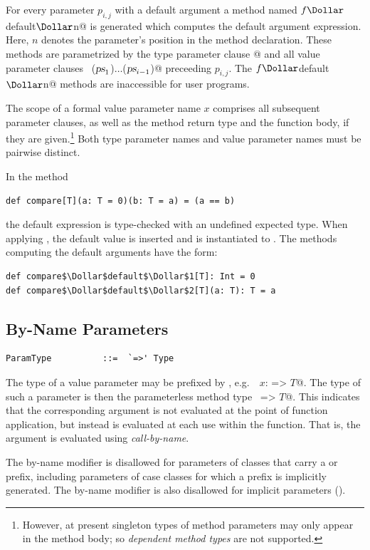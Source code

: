 For every parameter $p_{i,j}$ with a default argument a method named
\lstinline@$f\Dollar$default$\Dollar$n@ is generated which computes the default argument
expression. Here, $n$ denotes the parameter's position in the method
declaration. These methods are parametrized by the type parameter clause
\lstinline@[$\tps\,$]@ and all value parameter clauses
~\lstinline@($\mbox{\sl ps}_1$)$\ldots$($\mbox{\sl ps}_{i-1}$)@ preceeding $p_{i,j}$.
The \lstinline@$f\Dollar$default$\Dollar$n@ methods are inaccessible for
user programs.

The scope of a formal value parameter name $x$ comprises all subsequent parameter
clauses, as well as the method return type and the function body, if
they are given.\footnote{However, at present singleton types of method
parameters may only appear in the method body; so {\em dependent method
types} are not supported.} Both type parameter names
and value parameter names must be pairwise distinct.

\example In the method
\begin{lstlisting}
def compare[T](a: T = 0)(b: T = a) = (a == b)
\end{lstlisting}
the default expression  is type-checked with an undefined expected
type. When applying , the default value  is inserted
and  is instantiated to . The methods computing the default
arguments have the form:
\begin{lstlisting}
def compare$\Dollar$default$\Dollar$1[T]: Int = 0
def compare$\Dollar$default$\Dollar$2[T](a: T): T = a
\end{lstlisting}

\subsection{By-Name Parameters}\label{sec:by-name-params}

\syntax\begin{lstlisting} 
ParamType          ::=  `=>' Type
\end{lstlisting}

The type of a value parameter may be prefixed by \code{=>}, e.g.\
~\lstinline@$x$: => $T$@. The type of such a parameter is then the
parameterless method type ~\lstinline@=> $T$@. This indicates that the
corresponding argument is not evaluated at the point of function
application, but instead is evaluated at each use within the
function. That is, the argument is evaluated using {\em call-by-name}.

The by-name modifier is disallowed for parameters of classes that
carry a  or \code{var} prefix, including parameters of case
classes for which a \code{val} prefix is implicitly generated. The
by-name modifier is also disallowed for implicit parameters ().

